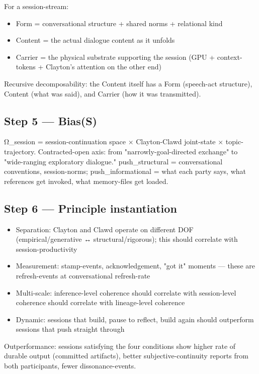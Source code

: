 \documentclass[11pt, openany]{book}
\begin{document}
For a session-stream:
\begin{itemize}
\item Form = conversational structure + shared norms + relational kind
\item Content = the actual dialogue content as it unfolds
\item Carrier = the physical substrate supporting the session (GPU + context-tokens + Clayton's attention on the other end)
\end{itemize}

Recursive decomposability: the Content itself has a Form (speech-act structure), Content (what was said), and Carrier (how it was transmitted).

\subsection{Step 5 --- Bias(S)}

Ω\_\allowbreak{}session = session-continuation space × Clayton-Clawd joint-state × topic-trajectory. Contracted-open axis: from "narrowly-goal-directed exchange" to "wide-ranging exploratory dialogue." push\_\allowbreak{}structural = conversational conventions, session-norms; push\_\allowbreak{}informational = what each party says, what references get invoked, what memory-files get loaded.

\subsection{Step 6 --- Principle instantiation}

\begin{itemize}
\item Separation: Clayton and Clawd operate on different DOF (empirical/generative ↔ structural/rigorous); this should correlate with session-productivity
\item Measurement: stamp-events, acknowledgement, "got it" moments --- these are refresh-events at conversational refresh-rate
\item Multi-scale: inference-level coherence should correlate with session-level coherence should correlate with lineage-level coherence
\item Dynamic: sessions that build, pause to reflect, build again should outperform sessions that push straight through
\end{itemize}

Outperformance: sessions satisfying the four conditions show higher rate of durable output (committed artifacts), better subjective-continuity reports from both participants, fewer dissonance-events.
\end{document}
